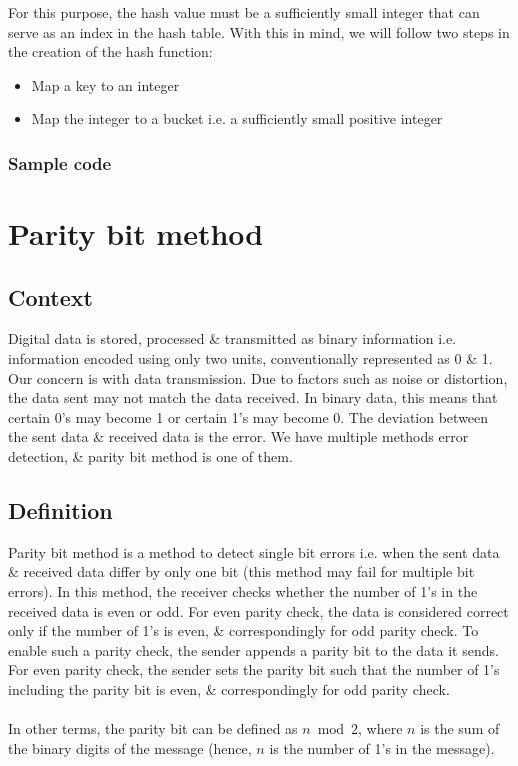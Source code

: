 For this purpose, the hash value must be a sufficiently small integer that can serve as an index in the hash table. With this in mind, we will follow two steps in the creation of the hash function:
\begin{itemize}
	\item Map a key to an integer
	\item Map the integer to a bucket i.e. a sufficiently small positive integer
\end{itemize}

\subsection{Sample code}


\chapter{Parity bit method}
\section{Context}
Digital data is stored, processed \& transmitted as binary information i.e. information encoded using only two units, conventionally represented as 0 \& 1. Our concern is with data transmission. Due to factors such as noise or distortion, the data sent may not match the data received. In binary data, this means that certain 0's may become 1 or certain 1's may become 0. The deviation between the sent data \& received data is the error. We have multiple methods error detection, \& parity bit method is one of them.

\section{Definition}
Parity bit method is a method to detect single bit errors i.e. when the sent data \& received data differ by only one bit (this method may fail for multiple bit errors). In this method, the receiver checks whether the number of 1's in the received data is even or odd. For even parity check, the data is considered correct only if the number of 1's is even, \& correspondingly for odd parity check. To enable such a parity check, the sender appends a parity bit to the data it sends. For even parity check, the sender sets the parity bit such that the number of 1's including the parity bit is even, \& correspondingly for odd parity check.
\\~\\
In other terms, the parity bit can be defined as $n \bmod 2$, where $n$ is the sum of the binary digits of the message (hence, $n$ is the number of 1's in the message).

